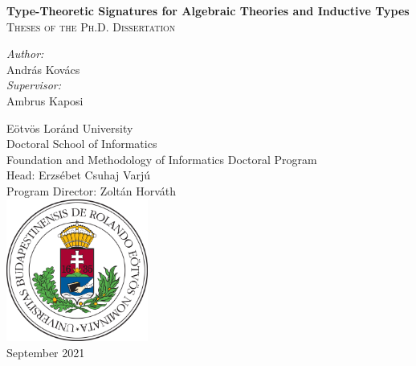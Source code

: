 \documentclass[12pt]{article}
\begin{document}
\clearpage

\begin{titlepage}
    \begin{center}
        \vspace*{1cm}

        {\LARGE \textbf{Type-Theoretic Signatures for Algebraic Theories and Inductive Types}}\\
        \vspace{1em}
        {\large \textsc{Theses of the Ph.D. Dissertation}}

        \vspace{2em}

        \textit{Author:}\\
        {\large András Kovács}\\
        \vspace{1em}
        \textit{Supervisor:}\\
        {\large Ambrus Kaposi}

        \vfill
        \vspace{4em}

        {\normalsize
        Eötvös Loránd University\\
        Doctoral School of Informatics\\
        Foundation and Methodology of Informatics Doctoral Program\\
        Head: Erzsébet Csuhaj Varjú\\
        Program Director: Zoltán Horváth\\}
        \vspace{1em}
        \includegraphics[width=0.35\textwidth]{elte_cimer_szines}\\
        \vspace{1em}
        {\large September 2021}

    \end{center}
\end{titlepage}
\thispagestyle{empty}





\end{document}
